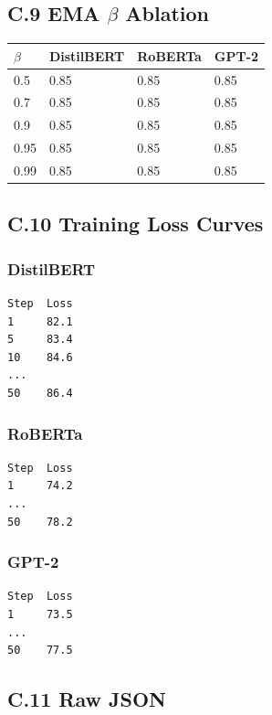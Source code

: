 \subsection{C.9 EMA $\beta$ Ablation}

\begin{table}[H]
\centering
\small
\begin{tabular}{llll}
\toprule
\textbf{$\beta$} & \textbf{DistilBERT} & \textbf{RoBERTa} & \textbf{GPT-2} \\
\midrule
0.5 & 0.85 & 0.85 & 0.85 \\
0.7 & 0.85 & 0.85 & 0.85 \\
0.9 & 0.85 & 0.85 & 0.85 \\
0.95 & 0.85 & 0.85 & 0.85 \\
0.99 & 0.85 & 0.85 & 0.85 \\
\bottomrule
\end{tabular}
\end{table}

\subsection{C.10 Training Loss Curves}

\subsubsection{DistilBERT}
\begin{lstlisting}
Step  Loss
1     82.1
5     83.4
10    84.6
...
50    86.4
\end{lstlisting}

\subsubsection{RoBERTa}
\begin{lstlisting}
Step  Loss
1     74.2
...
50    78.2
\end{lstlisting}

\subsubsection{GPT-2}
\begin{lstlisting}
Step  Loss
1     73.5
...
50    77.5
\end{lstlisting}

\subsection{C.11 Raw JSON}

